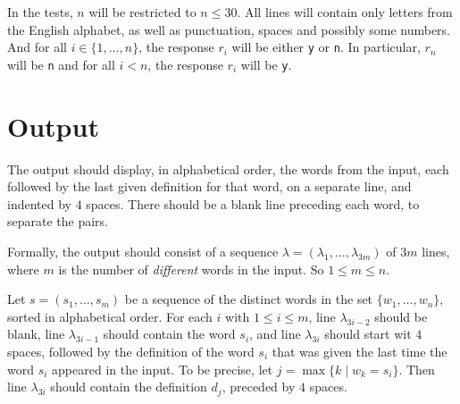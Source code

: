 In the tests, $n$ will be restricted to $n \le 30$.
All lines will contain only letters from the English alphabet,
as well as punctuation, spaces and possibly some numbers.
And for all $i \in \{1, \dots, n\}$,
the response $r_i$ will be either \texttt{y} or \texttt{n}.
In particular, $r_n$ will be \texttt{n}
and for all $i < n$, the response $r_i$ will be \texttt{y}.


\section*{Output}

The output should display,
in alphabetical order,
the words from the input,
each followed by the last given definition for that word,
on a separate line,
and indented by $4$ spaces.
There should be a blank line preceding each word,
to separate the pairs.

Formally, the output should consist of
a sequence $\lambda = (\lambda_1, \dots, \lambda_{3m})$ of $3m$ lines,
where $m$ is the number of \emph{different} words in the input.
So $1 \le m \le n$.

Let $s = (s_1, \dots, s_m)$ be a sequence of
the distinct words in the set $\{w_1, \dots, w_n\}$,
sorted in alphabetical order.
For each $i$ with $1 \le i \le m$,
line $\lambda_{3i-2}$ should be blank,
line $\lambda_{3i-1}$ should contain the word $s_i$,
and line $\lambda_{3i}$ should start wit $4$ spaces,
followed by the definition of the word $s_i$
that was given the last time the word $s_i$ appeared in the input.
To be precise, let $j = \max\{k\mid w_k = s_i\}$.
Then line $\lambda_{3i}$ should contain the definition $d_j$,
preceded by $4$ spaces.
